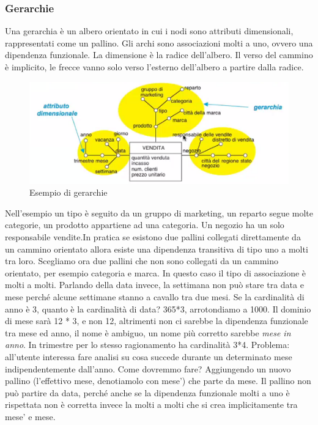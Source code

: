\subsubsection{Gerarchie}
Una gerarchia è un albero orientato in cui i nodi sono attributi dimensionali, rappresentati come un pallino. Gli archi sono associazioni molti a uno, ovvero una dipendenza funzionale.\newline
La dimensione è la radice dell'albero.\newline
Il verso del cammino è implicito, le frecce vanno solo verso l'esterno dell'albero a partire dalla radice.
\begin{figure}[H]
	\begin{center}
		\includegraphics[width=0.5\linewidth]{img/ger.PNG}
		\caption{Esempio di gerarchie}
	\end{center}
\end{figure}
\noindent Nell'esempio un tipo è seguito da un gruppo di marketing, un reparto segue molte categorie, un prodotto appartiene ad una categoria. Un negozio ha un solo responsabile vendite.\newline In pratica se esistono due pallini collegati direttamente da un cammino orientato allora esiste una dipendenza transitiva di tipo uno a molti tra loro.\newline
Scegliamo ora due pallini che non sono collegati da un cammino orientato, per esempio categoria e marca. In questo caso il tipo di associazione è molti a molti.\newline
Parlando della data invece, la settimana non può stare tra data e mese perché alcune settimane stanno a cavallo tra due mesi.\newline
Se la cardinalità di anno è 3, quanto è la cardinalità di data? 365*3, arrotondiamo a 1000. Il dominio di mese sarà 12 * 3, e non 12, altrimenti non ci sarebbe la dipendenza funzionale tra mese ed anno, il nome è ambiguo, un nome più corretto sarebbe \textit{mese in anno}. In trimestre per lo stesso ragionamento ha cardinalità 3*4.\newline
Problema: all'utente interessa fare analisi su cosa succede durante un determinato mese indipendentemente dall'anno. Come dovremmo fare? Aggiungendo un nuovo pallino (l'effettivo mese, denotiamolo con mese') che parte da mese. Il pallino non può partire da data, perché anche se la dipendenza funzionale molti a uno è rispettata non è corretta invece la molti a molti che si crea implicitamente tra mese' e mese.\newline\newline
